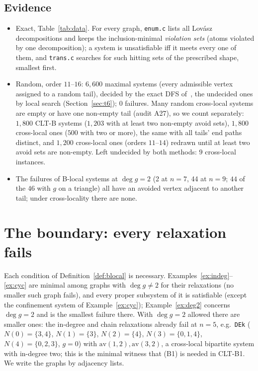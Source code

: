 \documentclass[11pt]{amsart}
\theoremstyle{definition}
\newcommand{\av}{\mathrm{av}}
\begin{document}
\subsection*{Evidence}
\begin{itemize}
\item Exact, Table~\ref{tab:data}. For every graph, \texttt{enum.c} lists all Lov\'asz
decompositions and keeps the inclusion-minimal \emph{violation sets} (atoms violated by one
decomposition); a system is unsatisfiable iff it meets every one of them, and \texttt{trans.c}
searches for such hitting sets of the prescribed shape, smallest first.
\item Random, order $11$--$16$: $6{,}600$ maximal systems (every admissible vertex assigned to a
random tail), decided by the exact DFS of~\cite{T6}, the undecided ones by local search
(Section~\ref{sec:t6}); $0$ failures. Many random cross-local systems are empty or have one
non-empty tail (audit A27), so we count separately: $1{,}800$ CLT-B systems ($1{,}203$ with at least two
non-empty avoid sets), $1{,}800$ cross-local ones ($500$ with two or more), the same with all tails'
end paths distinct, and $1{,}200$ cross-local ones (orders $11$--$14$) redrawn until at least two
avoid sets are non-empty. Left undecided by both methods: $9$ cross-local instances.
\item The failures of B-local systems at $\deg g=2$ (2 at $n=7$, 44 at $n=9$; $44$ of the $46$ with
$g$ on a triangle) all have an avoided vertex adjacent to another tail; under cross-locality there
are none.
\end{itemize}

\section{The boundary: every relaxation fails}\label{sec:sharp}

Each condition of Definition~\ref{def:blocal} is necessary. Examples~\ref{ex:indeg}--\ref{ex:cyc} are
minimal among graphs with $\deg g\ne2$ for their relaxations (no smaller such graph fails), and every proper
subsystem of it is satisfiable (except the confinement system of Example~\ref{ex:cyc});
Example~\ref{ex:deg2} concerns $\deg g=2$ and is the smallest failure there. With
$\deg g=2$ allowed there are smaller ones: the in-degree and chain relaxations already fail at $n=5$,
e.g.\ \texttt{DEk} ($N(0)=\{3,4\}$, $N(1)=\{3\}$, $N(2)=\{4\}$, $N(3)=\{0,1,4\}$,
$N(4)=\{0,2,3\}$, $g=0$) with $\av(1,2),\av(3,2)$, a cross-local bipartite system with in-degree two;
this is the minimal witness that (B1) is needed in CLT-B1. We write the graphs by adjacency lists.
\end{document}
